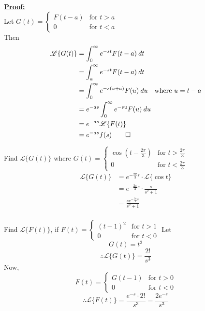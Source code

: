 \documentclass[12pt]{article}
\newcommand{\Lap}{\mathscr{L}}
\begin{document}
\underline{\textbf{Proof: }} \\
Let \( G(t) =
\begin{cases}
    F(t-a) & \text{for } t>a \\
    0 & \text{for } t < a
\end{cases}\)\\
Then\\
\begin{align*}
    \Lap \{ G(t) \} &= \int_{0}^{\infty} {e^{-st}F(t-a)} \: d{t} \\
    &= \int_{a}^{\infty} {e^{-st}F(t-a)} \: d{t} \\
    &= \int_{0}^{\infty} {e^{-s(u+a)}F(u)} \: d{u} \quad \text{where } u=t-a \\
    &= e^{-as} \int_{0}^{\infty} {e^{-su}F(u)} \: d{u} \\
    &= e^{-as} \Lap \{ F(t) \} \\
    &= e^{-as} f(s)\qed
\end{align*}

\begin{example}{
        Find $\Lap \{ G(t) \}$ where $
        G(t) = 
        \begin{cases}
            \cos{\left( t - \frac{2\pi}{3} \right)} & \text{for } t > \frac{2\pi}{3} \\
            0 & \text{for } t < \frac{2\pi}{3}
        \end{cases}
        $
    }{}
    \begin{align*}
        \Lap \{ G(t) \} &= e^{-\frac{2\pi}{3}s} \cdot \Lap \{ \cos{t} \} \\
        &= e^{-\frac{2\pi}{3}s} \cdot \frac{s}{s^2+1} \\
        &= \frac{s e^{-\frac{2\pi}{3}s}}{s^2+1} \\
    \end{align*}
\end{example}

\begin{example}{Find $\Lap \{ F(t) \}$, if \( F(t) =
    \begin{cases}
        (t-1)^2 & \text{for } t > 1 \\
        0 & \text{for } t < 0
    \end{cases}\)}{}
    Let \[
        G(t) = t^2
    \] \[ \therefore \Lap \{ G(t) \} = \frac{2!}{s^3} \]
    Now, \[
        F(t) =
        \begin{cases}
            G(t-1) & \text{for } t > 0 \\
            0 & \text{for } t < 0
        \end{cases}
    \]
    \[ \therefore \Lap \{ F(t) \} = \frac{e^{-s} \cdot 2!}{s^3} = \frac{2e^{-s}}{s^3} \]
\end{example}
\end{document}
